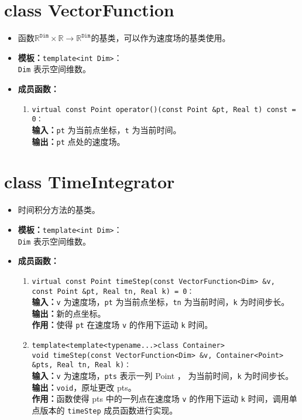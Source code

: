 \documentclass[a4paper,twoside]{ctexart}
\begin{document}
\section{class VectorFunction}
\begin{itemize}
    \item 函数$\mathbb{R}^{\texttt{Dim}}\times\mathbb{R}\rightarrow\mathbb{R}^{\texttt{Dim}}$的基类，可以作为速度场的基类使用。
    \item \textbf{模板：}\texttt{template<int Dim>}：\\\texttt{Dim} 表示空间维数。
    \item \textbf{成员函数：}
            \begin{enumerate}[(1)]
                \item \texttt{virtual const Point operator()(const Point \&pt, Real t) const = 0：}\\
                \textbf{输入：}\texttt{pt} 为当前点坐标，\texttt{t} 为当前时间。\\
                \textbf{输出：}\texttt{pt} 点处的速度场。\\
            \end{enumerate}
\end{itemize}

\section{class TimeIntegrator}
\begin{itemize}
    \item 时间积分方法的基类。
    \item \textbf{模板：}\texttt{template<int Dim>}：\\\texttt{Dim} 表示空间维数。
    \item \textbf{成员函数：}
            \begin{enumerate}[(1)]
                \item \texttt{virtual const Point timeStep(const VectorFunction<Dim> \&v, const Point \&pt, Real tn, Real k) = 0：}\\
                \textbf{输入：}\texttt{v} 为速度场，\texttt{pt} 为当前点坐标，\texttt{tn} 为当前时间，\texttt{k} 为时间步长。\\
                \textbf{输出：}新的点坐标。\\
                \textbf{作用：}使得 \texttt{pt} 在速度场 \texttt{v} 的作用下运动 \texttt{k} 时间。
                \item \texttt{template<template<typename...>class Container>\\void timeStep(const VectorFunction<Dim> \&v, Container<Point> \&pts, Real tn, Real k)：}\\
                \textbf{输入：}\texttt{v} 为速度场，\texttt{pts} 表示一列 Point ， 为当前时间，\texttt{k} 为时间步长。\\
                \textbf{输出：}\texttt{void}，原址更改 pts。\\
                \textbf{作用：}函数使得 pts 中的一列点在速度场 \texttt{v} 的作用下运动 \texttt{k} 时间，调用单点版本的 \texttt{timeStep} 成员函数进行实现。
            \end{enumerate}
\end{itemize}
\end{document}
